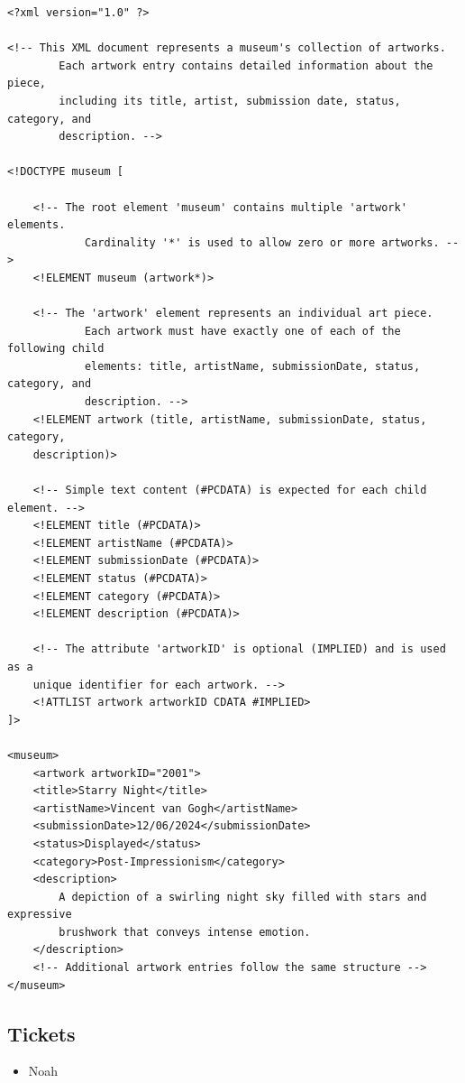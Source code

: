 \documentclass{article} %
\begin{document}
\begin{verbatim}
<?xml version="1.0" ?>

<!-- This XML document represents a museum's collection of artworks. 
        Each artwork entry contains detailed information about the piece,
        including its title, artist, submission date, status, category, and 
        description. -->

<!DOCTYPE museum [

    <!-- The root element 'museum' contains multiple 'artwork' elements. 
            Cardinality '*' is used to allow zero or more artworks. -->
    <!ELEMENT museum (artwork*)>

    <!-- The 'artwork' element represents an individual art piece.
            Each artwork must have exactly one of each of the following child 
            elements: title, artistName, submissionDate, status, category, and 
            description. -->
    <!ELEMENT artwork (title, artistName, submissionDate, status, category, 
    description)>

    <!-- Simple text content (#PCDATA) is expected for each child element. -->
    <!ELEMENT title (#PCDATA)>
    <!ELEMENT artistName (#PCDATA)>
    <!ELEMENT submissionDate (#PCDATA)>
    <!ELEMENT status (#PCDATA)>
    <!ELEMENT category (#PCDATA)>
    <!ELEMENT description (#PCDATA)>

    <!-- The attribute 'artworkID' is optional (IMPLIED) and is used as a 
    unique identifier for each artwork. -->
    <!ATTLIST artwork artworkID CDATA #IMPLIED>
]>

<museum>
    <artwork artworkID="2001">
    <title>Starry Night</title>
    <artistName>Vincent van Gogh</artistName>
    <submissionDate>12/06/2024</submissionDate>
    <status>Displayed</status>
    <category>Post-Impressionism</category>
    <description>
        A depiction of a swirling night sky filled with stars and expressive 
        brushwork that conveys intense emotion.
    </description>
    <!-- Additional artwork entries follow the same structure -->
</museum>
\end{verbatim}

\subsection{Tickets}
\begin{itemize}
    \item Noah
\end{itemize}
\end{document}
